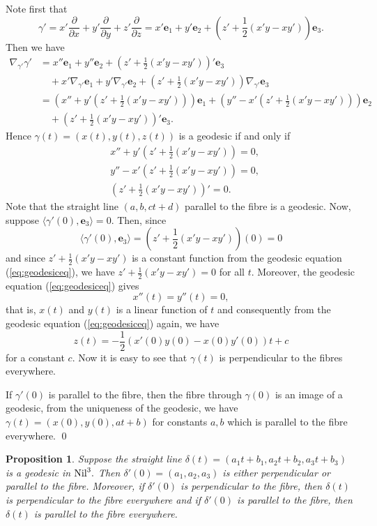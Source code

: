 \documentclass[11pt]{amsart}
\newtheorem{prop}{Proposition}[section]
\begin{document}
\noindent[Proof] Note first that
\[
\gamma'
    = x'\frac{\partial}{\partial x} + y'\frac{\partial}{\partial y}
      + z'\frac{\partial}{\partial z} =  x'{\mathbf{e}}_1 + y'{\mathbf{e}}_2
      + \left(z'+\frac12(x'y-xy')\right){\mathbf{e}}_3.
\]
Then we have
\[
\begin{aligned}
  \nabla_{\gamma'}\gamma'
      &= x'' {\mathbf{e}}_1 + y''{\mathbf{e}}_2
         +  \left(z'+\frac12(x'y-xy')\right)'{\mathbf{e}}_3\\
      &\quad +x'\nabla_{\gamma'}{\mathbf{e}}_1 +y'\nabla_{\gamma'}{\mathbf{e}}_2
         +\left(z'+\frac12(x'y-xy')\right)\nabla_{\gamma'}{\mathbf{e}}_3    \\
      &= \left(x''+y'(z'+\frac12(x'y-xy'))\right){\mathbf{e}}_1
          + \left(y''-x'(z'+\frac12(x'y-xy'))\right){\mathbf{e}}_2 \\
      &\quad  + \left(z'+\frac12(x'y-xy')\right)'{\mathbf{e}}_3.
\end{aligned}
\]
Hence $\gamma(t)=(x(t), y(t), z(t))$ is a geodesic if and only if
\begin{equation}\label{eq:geodesiceq}
\begin{aligned}
&x''+y'(z'+\frac12(x'y-xy'))=0,\\
&y''-x'(z'+\frac12(x'y-xy'))=0,\\
&\left(z'+\frac12(x'y-xy')\right)'=0.
\end{aligned}
\end{equation}
Note that the straight line $(a, b, ct+d)$ parallel to the fibre
is a geodesic. Now, suppose $\langle \gamma'(0), {\mathbf{e}}_3\rangle=0.$
Then, since
$$\langle \gamma'(0),
{\mathbf{e}}_3\rangle=\left(z'+\frac12(x'y-xy')\right)(0)=0$$ and since
$z'+\frac12(x'y-xy')$ is a constant function from the geodesic
equation (\ref{eq:geodesiceq}), we have $z'+\frac12(x'y-xy')=0$
for all $t.$ Moreover, the geodesic equation (\ref{eq:geodesiceq})
gives
$$x''(t)=y''(t)=0,$$
that is, $x(t)$ and $y(t)$ is a linear function of $t$ and
consequently from the geodesic equation (\ref{eq:geodesiceq})
again, we have
$$z(t)= -\frac12(x'(0)y(0)-x(0)y'(0))t+c$$
for a constant $c.$ Now it is easy to see that $\gamma(t)$ is
perpendicular to the fibres everywhere.

If $\gamma'(0)$ is parallel to the fibre, then the fibre through
$\gamma(0)$ is an image of a geodesic, from the uniqueness of the
geodesic, we have $\gamma(t)=(x(0), y(0), at+b)$ for constants $a,
b$ which is parallel to the fibre everywhere. \qed

\begin{prop}
Suppose the straight line $\delta(t)=(a_1t+b_1, a_2t+b_2,
a_3t+b_3)$ is a geodesic in $\text{\rm Nil}^3.$ Then
$\delta'(0)=(a_1, a_2, a_3)$ is either perpendicular or parallel
to the fibre. Moreover, if $\delta'(0)$ is perpendicular to the
fibre, then $\delta(t)$ is perpendicular to the fibre everywhere
and if $\delta'(0)$ is parallel to the fibre, then $\delta(t)$ is
parallel to the fibre everywhere.
\end{prop}
\end{document}

